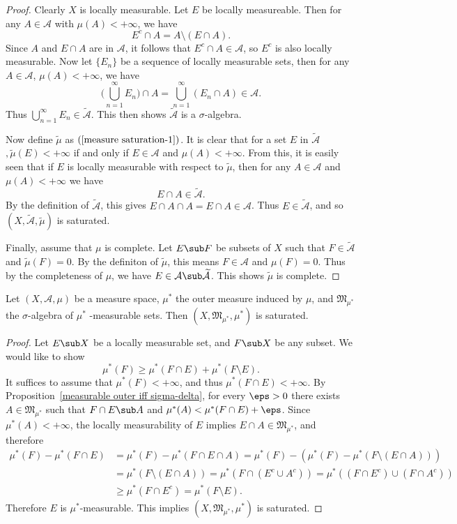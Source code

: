 \begin{proof}
Clearly $X$ is locally measurable. Let $E$ be locally measureable. Then for any $A\in\mathcal{A}$ with $\mu(A)<+\infty$, we have
\[E^c\cap A=A\setminus(E\cap A).\]
Since $A$ and $E\cap A$ are in $\mathcal{A}$, it follows that $E^c\cap A\in\mathcal{A}$, so $E^c$ is also locally measurable. Now let $\{E_n\}$ be a sequence of locally measurable sets, then for any $A\in\mathcal{A}$, $\mu(A)<+\infty$, we have
\[\Big(\bigcup_{n=1}^{\infty}E_n\Big)\cap A=\bigcup_{n=1}^{\infty}(E_n\cap A)\in\mathcal{A}.\]
Thus $\bigcup_{n=1}^{\infty}E_n\in\widetilde{\mathcal{A}}$. This then shows $\widetilde{\mathcal{A}}$ is a $\sigma$-algebra.\par
Now define $\widetilde{\mu}$ as $(\ref{measure saturation-1})$. It is clear that for a set $E$ in $\widetilde{\mathcal{A}}$$, \widetilde{\mu}(E)<+\infty$ if and only if $E\in\mathcal{A}$ and $\mu(A)<+\infty$. From this, it is easily seen that if $E$ is locally measurable with respect to $\widetilde{\mu}$, then for any $A\in\mathcal{A}$ and $\mu(A)<+\infty$ we have
\[E\cap A\in\widetilde{\mathcal{A}}.\]
By the definition of $\widetilde{\mathcal{A}}$, this gives $E\cap A\cap A=E\cap A\in\mathcal{A}$. Thus $E\in\widetilde{\mathcal{A}}$, and so $(X,\widetilde{\mathcal{A}},\widetilde{\mu})$ is saturated.\par
Finally, assume that $\mu$ is complete. Let $E\sub F$ be subsets of $X$ such that $F\in\widetilde{\mathcal{A}}$ and $\widetilde{\mu}(F)=0$. By the definiton of $\widetilde{\mu}$, this means $F\in\mathcal{A}$ and $\mu(F)=0$. Thus by the completeness of $\mu$, we have $E\in\mathcal{A}\sub\widetilde{\mathcal{A}}$. This shows $\widetilde{\mu}$ is complete.
\end{proof}
\begin{proposition}\label{measure outer measurable is saturated}
Let $(X,\mathcal{A},\mu)$ be a measure space, $\mu^*$ the outer measure induced by $\mu$, and $\mathfrak{M}_{\mu^*}$ the $\sigma$-algebra of $\mu^*$ -measurable sets. Then $(X,\mathfrak{M}_{\mu^*},\mu^*)$ is saturated.
\end{proposition}
\begin{proof}
Let $E\sub X$ be a locally measurable set, and $F\sub X$ be any subset. We would like to show
\[\mu^*(F)\geq\mu^*(F\cap E)+\mu^*(F\setminus E).\]
It suffices to assume that $\mu^*(F)<+\infty$, and thus $\mu^*(F\cap E)<+\infty$. By Proposition~\ref{measurable outer iff sigma-delta}, for every $\eps>0$ there exists $A\in\mathfrak{M}_{\mu^*}$ such that $F\cap E\sub A$ and $\mu^*(A)<\mu^*(F\cap E)+\eps$. Since $\mu^*(A)<+\infty$, the locally measurability of $E$ implies $E\cap A\in\mathfrak{M}_{\mu^*}$, and therefore
\begin{align*}
\mu^*(F)-\mu^*(F\cap E)&=\mu^*(F)-\mu^*(F\cap E\cap A)=\mu^*(F)-(\mu^*(F)-\mu^*(F\setminus(E\cap A)))\\
&=\mu^*(F\setminus(E\cap A))=\mu^*(F\cap(E^c\cup A^c))=\mu^*((F\cap E^c)\cup(F\cap A^c))\\
&\geq\mu^*(F\cap E^c)=\mu^*(F\setminus E).
\end{align*}
Therefore $E$ is $\mu^*$-measurable. This implies $(X,\mathfrak{M}_{\mu^*},\mu^*)$ is saturated.
\end{proof}
